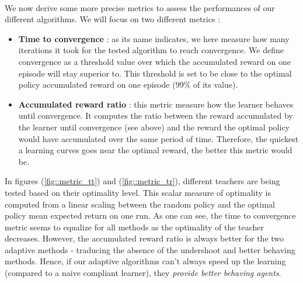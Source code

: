 \documentclass[a4paper]{report}
\begin{document}
{{{{				\paragraph{} We now derive some more precise metrics to assess the performances of our different algorithms. We will focus on two different metrics : 
				\begin{itemize}[label=$\cdot$]
					\item \textbf{Time to convergence} : as its name indicates, we here measure how many iterations it took for the tested algorithm to reach convergence. We define convergence as a threshold value over which the accumulated reward on one episode will stay superior to. This threshold is set to be close to the optimal policy accumulated reward on one episode (99\% of its value). 
					\item \textbf{Accumulated reward ratio} : this metric measure how the learner behaves until convergence. It computes the ratio between the reward accumulated by the learner until convergence (see above) and the reward the optimal policy would have accumulated over the same period of time. Therefore, the quickest a learning curves goes near the optimal reward, the better this metric would be. 
				\end{itemize}
				 In figures (\ref{fig::metric_tt}) and (\ref{fig::metric_tr}), different teachers are being tested based on their optimality level. This scalar measure of optimality is computed from a linear scaling between the random policy and the optimal policy mean expected return on one run. As one can see, the time to convergence metric seems to equalize for all methods as the optimality of the teacher decreases. However, the accumulated reward ratio is always better for the two adaptive methods - traducing the absence of the undershoot and better behaving methods. Hence, if our adaptive algorithms can't always speed up the learning (compared to a naive compliant learner), they \emph{provide better behaving agents}. 
				
}}}}
\end{document}
